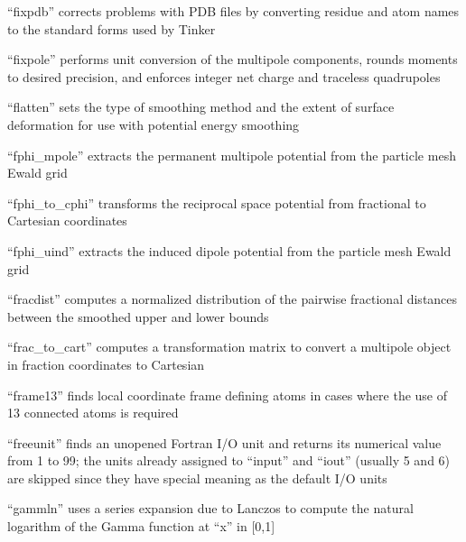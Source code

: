 \documentclass[letterpaper,11pt,english]{sphinxmanual}
\begin{document}
“fixpdb” corrects problems with PDB files by converting residue
and atom names to the standard forms used by Tinker


“fixpole” performs unit conversion of the multipole components,
rounds moments to desired precision, and enforces integer net
charge and traceless quadrupoles


“flatten” sets the type of smoothing method and the extent of
surface deformation for use with potential energy smoothing


“fphi\_mpole” extracts the permanent multipole potential from
the particle mesh Ewald grid


“fphi\_to\_cphi” transforms the reciprocal space potential from
fractional to Cartesian coordinates


“fphi\_uind” extracts the induced dipole potential from
the particle mesh Ewald grid


“fracdist” computes a normalized distribution of the pairwise
fractional distances between the smoothed upper and lower bounds


“frac\_to\_cart” computes a transformation matrix to convert
a multipole object in fraction coordinates to Cartesian


“frame13” finds local coordinate frame defining atoms in cases
where the use of 1\sphinxhyphen{}3 connected atoms is required


“freeunit” finds an unopened Fortran I/O unit and returns
its numerical value from 1 to 99; the units already assigned
to “input” and “iout” (usually 5 and 6) are skipped since
they have special meaning as the default I/O units


“gammln” uses a series expansion due to Lanczos to compute
the natural logarithm of the Gamma function at “x” in {[}0,1{]}
\end{document}
